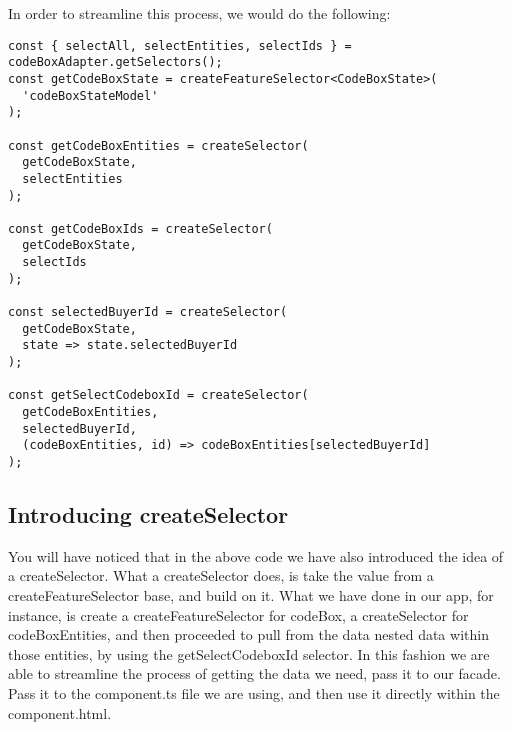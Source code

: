 In order to streamline this process, we would do the following:
\begin{lstlisting}
const { selectAll, selectEntities, selectIds } = codeBoxAdapter.getSelectors();
const getCodeBoxState = createFeatureSelector<CodeBoxState>(
  'codeBoxStateModel'
);

const getCodeBoxEntities = createSelector(
  getCodeBoxState,
  selectEntities
);

const getCodeBoxIds = createSelector(
  getCodeBoxState,
  selectIds
);

const selectedBuyerId = createSelector(
  getCodeBoxState,
  state => state.selectedBuyerId
);

const getSelectCodeboxId = createSelector(
  getCodeBoxEntities,
  selectedBuyerId,
  (codeBoxEntities, id) => codeBoxEntities[selectedBuyerId]
);
\end{lstlisting}


\subsection{Introducing createSelector}
You will have noticed that in the above code we have also introduced the idea
of a createSelector. What a createSelector does, is take the value from a
createFeatureSelector base, and build on it. What we have done in our app, for
instance, is create a createFeatureSelector for codeBox, a createSelector for
codeBoxEntities, and then proceeded to pull from the data nested data within
those entities, by using the getSelectCodeboxId selector. In this fashion we
are able to streamline the process of getting the data we need, pass it to our
facade. Pass it to the component.ts file we are using, and then use it directly
within the component.html.

